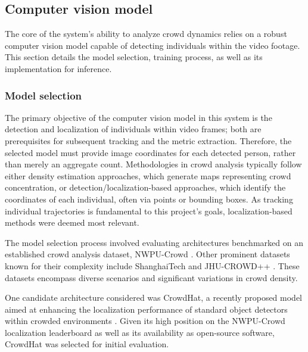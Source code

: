 % 
\subsection{Computer vision model}
\label{sec:cv_model}


The core of the system's ability to analyze crowd dynamics relies on a robust computer vision model capable of detecting individuals within the video footage. This section details the model selection, training process, as well as its implementation for inference.

\subsubsection{Model selection}

The primary objective of the computer vision model in this system is the detection and localization of individuals within video frames; both are prerequisites for subsequent tracking and the metric extraction. Therefore, the selected model must provide image coordinates for each detected person, rather than merely an aggregate count. Methodologies in crowd analysis typically follow either density estimation approaches, which generate maps representing crowd concentration, or detection/localization-based approaches, which identify the coordinates of each individual, often via points or bounding boxes. As tracking individual trajectories is fundamental to this project's goals, localization-based methods were deemed most relevant.

The model selection process involved evaluating architectures benchmarked on an established crowd analysis dataset, NWPU-Crowd \cite{nwpu}. Other prominent datasets known for their complexity include ShanghaiTech and JHU-CROWD++ \cite{shanghai_tech} \cite{jhu_crowd}. These datasets encompass diverse scenarios and significant variations in crowd density.

One candidate architecture considered was CrowdHat, a recently proposed model aimed at enhancing the localization performance of standard object detectors within crowded environments \cite{crowdhat}. Given its high position on the NWPU-Crowd localization leaderboard as well as its availability as open-source software, CrowdHat was selected for initial evaluation.

